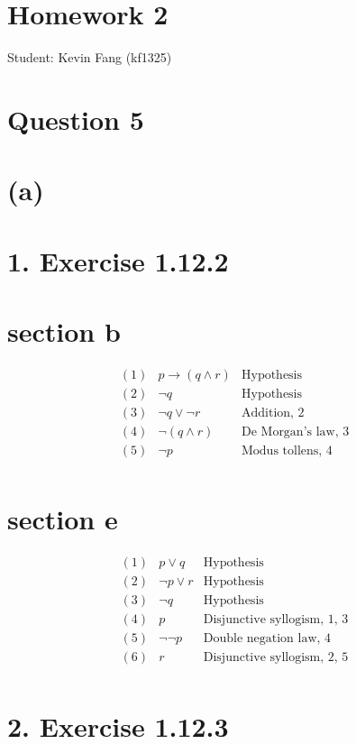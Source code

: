 \documentclass[10pt]{article}
\begin{document}
\section*{Homework 2}
Student: Kevin Fang (kf1325)

\section*{Question 5}
\section*{(a)}
\section*{1. Exercise 1.12.2}
\section*{section b}
\[
\begin{array}{rrr}
(1) & p \rightarrow (q \wedge r) & \text{Hypothesis} \\
(2) & \neg q & \text{Hypothesis} \\
(3) & \neg q \vee \neg r & \text{Addition, 2} \\
(4) & \neg(q \wedge r) & \text{De Morgan's law, 3} \\
(5) & \neg p & \text{Modus tollens, 4} \\
\end{array}
\]

\section*{section e}

\[
\begin{array}{rrr}
(1) & p \vee q & \text{Hypothesis} \\
(2) & \neg p \vee r & \text{Hypothesis} \\
(3) & \neg q & \text{Hypothesis} \\
(4) & p & \text{Disjunctive syllogism, 1, 3} \\
(5) & \neg \neg p & \text{Double negation law, 4} \\
(6) & r & \text{Disjunctive syllogism, 2, 5} \\
\end{array}
\]

\section*{2. Exercise 1.12.3}
\end{document}
